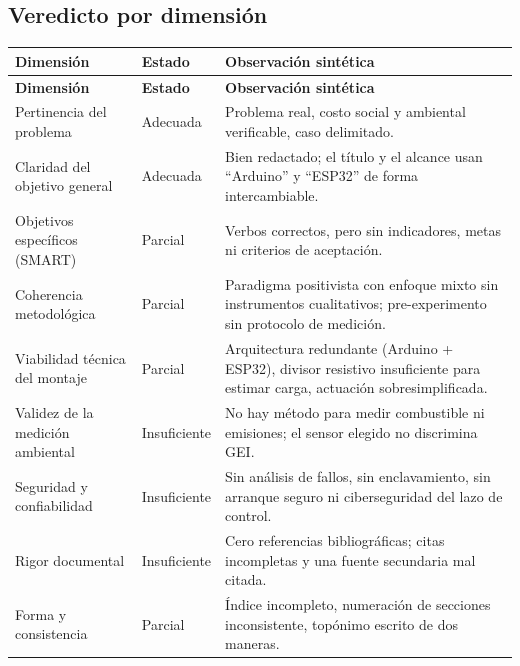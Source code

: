 \documentclass[11pt,a4paper]{article}
\begin{document}
\subsection*{Veredicto por dimensión}

\begingroup\small
\begin{longtable}{@{}>{\raggedright\arraybackslash}p{4.3cm} >{\centering\arraybackslash}p{2.3cm} >{\raggedright\arraybackslash}p{9.0cm}@{}}
\toprule
\textbf{Dimensión} & \textbf{Estado} & \textbf{Observación sintética} \\
\midrule
\endfirsthead
\toprule
\textbf{Dimensión} & \textbf{Estado} & \textbf{Observación sintética} \\
\midrule
\endhead
Pertinencia del problema & \cellcolor{verdeSignal!30}Adecuada & Problema real, costo social y ambiental verificable, caso delimitado. \\
Claridad del objetivo general & \cellcolor{verdeSignal!30}Adecuada & Bien redactado; el título y el alcance usan ``Arduino'' y ``ESP32'' de forma intercambiable. \\
Objetivos específicos (SMART) & \cellcolor{amarilloNota!35}Parcial & Verbos correctos, pero sin indicadores, metas ni criterios de aceptación. \\
Coherencia metodológica & \cellcolor{amarilloNota!35}Parcial & Paradigma positivista con enfoque mixto sin instrumentos cualitativos; pre-experimento sin protocolo de medición. \\
Viabilidad técnica del montaje & \cellcolor{amarilloNota!35}Parcial & Arquitectura redundante (Arduino + ESP32), divisor resistivo insuficiente para estimar carga, actuación sobresimplificada. \\
Validez de la medición ambiental & \cellcolor{rojoAlerta!25}Insuficiente & No hay método para medir combustible ni emisiones; el sensor elegido no discrimina GEI. \\
Seguridad y confiabilidad & \cellcolor{rojoAlerta!25}Insuficiente & Sin análisis de fallos, sin enclavamiento, sin arranque seguro ni ciberseguridad del lazo de control. \\
Rigor documental & \cellcolor{rojoAlerta!25}Insuficiente & Cero referencias bibliográficas; citas incompletas y una fuente secundaria mal citada. \\
Forma y consistencia & \cellcolor{amarilloNota!35}Parcial & Índice incompleto, numeración de secciones inconsistente, topónimo escrito de dos maneras. \\
\bottomrule
\end{longtable}
\endgroup
\end{document}
